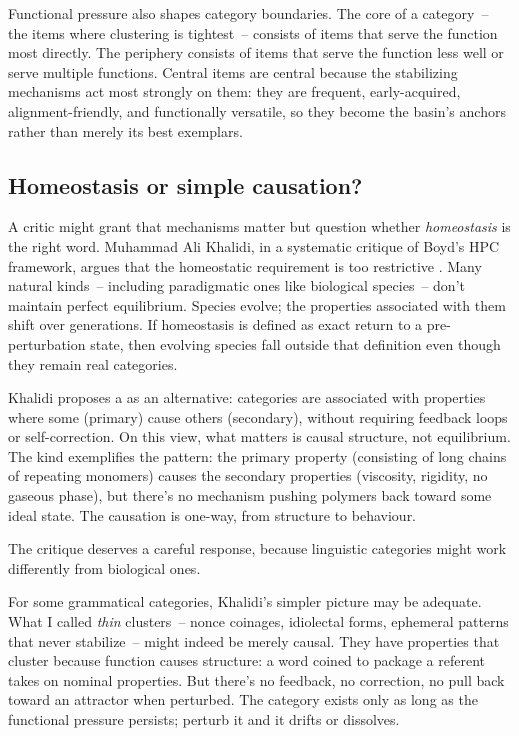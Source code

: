 Functional pressure also shapes category boundaries. The core of a category~-- the items where clustering is tightest~-- consists of items that serve the function most directly. The periphery consists of items that serve the function less well or serve multiple functions. Central items are central because the stabilizing mechanisms act most strongly on them: they are frequent, early-acquired, alignment-friendly, and functionally versatile, so they become the basin's anchors rather than merely its best exemplars.


\subsection{Homeostasis or simple causation?}
\label{subsec:4:homeostasis-causation}

A critic might grant that mechanisms matter but question whether \emph{homeostasis} is the right word. Muhammad Ali Khalidi, in a systematic critique of Boyd's HPC framework, argues that the homeostatic requirement is too restrictive \citep[72--79]{khalidi2013}. Many natural kinds~-- including paradigmatic ones like biological species~-- don't maintain perfect equilibrium. Species evolve; the properties associated with them shift over generations. If homeostasis is defined as exact return to a pre-perturbation state, then evolving species fall outside that definition even though they remain real categories.

Khalidi proposes a  as an alternative: categories are associated with properties where some (primary) cause others (secondary), without requiring feedback loops or self-correction. On this view, what matters is causal structure, not equilibrium. The kind  exemplifies the pattern: the primary property (consisting of long chains of repeating monomers) causes the secondary properties (viscosity, rigidity, no gaseous phase), but there's no mechanism pushing polymers back toward some ideal state. The causation is one-way, from structure to behaviour.

The critique deserves a careful response, because linguistic categories might work differently from biological ones.

For some grammatical categories, Khalidi's simpler picture may be adequate. What I called \emph{thin} clusters~-- nonce coinages, idiolectal forms, ephemeral patterns that never stabilize~-- might indeed be merely causal. They have properties that cluster because function causes structure: a word coined to package a referent takes on nominal properties. But there's no feedback, no correction, no pull back toward an attractor when perturbed. The category exists only as long as the functional pressure persists; perturb it and it drifts or dissolves.

